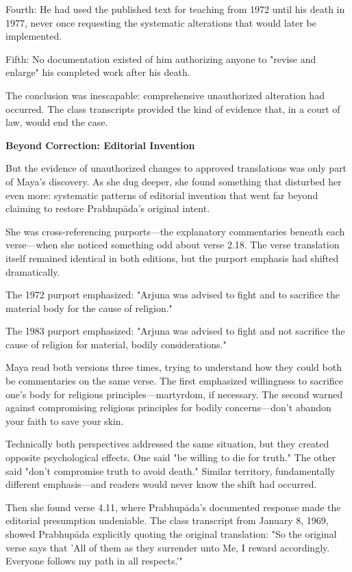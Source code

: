 \documentclass[12pt,twoside]{book}
\begin{document}
Fourth: He had used the published text for teaching from 1972 until his death in 1977, never once requesting the systematic alterations that would later be implemented.

Fifth: No documentation existed of him authorizing anyone to "revise and enlarge" his completed work after his death.

The conclusion was inescapable: comprehensive unauthorized alteration had occurred. The class transcripts provided the kind of evidence that, in a court of law, would end the case.



\vspace{0.5cm}
\textbf{Beyond Correction: Editorial Invention}
\vspace{0.2cm}


But the evidence of unauthorized changes to approved translations was only part of Maya's discovery. As she dug deeper, she found something that disturbed her even more: systematic patterns of editorial invention that went far beyond claiming to restore Prabhupāda's original intent.

She was cross-referencing purports—the explanatory commentaries beneath each verse—when she noticed something odd about verse 2.18. The verse translation itself remained identical in both editions, but the purport emphasis had shifted dramatically.

The 1972 purport emphasized: "Arjuna was advised to fight and to sacrifice the material body for the cause of religion."

The 1983 purport emphasized: "Arjuna was advised to fight and not sacrifice the cause of religion for material, bodily considerations."

Maya read both versions three times, trying to understand how they could both be commentaries on the same verse. The first emphasized willingness to sacrifice one's body for religious principles—martyrdom, if necessary. The second warned against compromising religious principles for bodily concerns—don't abandon your faith to save your skin.

Technically both perspectives addressed the same situation, but they created opposite psychological effects. One said "be willing to die for truth." The other said "don't compromise truth to avoid death." Similar territory, fundamentally different emphasis—and readers would never know the shift had occurred.

Then she found verse 4.11, where Prabhupāda's documented response made the editorial presumption undeniable. The class transcript from January 8, 1969, showed Prabhupāda explicitly quoting the original translation: "So the original verse says that 'All of them as they surrender unto Me, I reward accordingly. Everyone follows my path in all respects.'"
\end{document}
